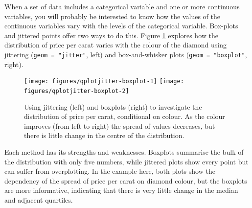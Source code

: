 
When a set of data includes a categorical variable and one or more
continuous variables, you will probably be interested to know how the
values of the continuous variables vary with the levels of the
categorical variable. Box-plots and jittered points offer two ways to do
this. Figure \ref{fig:jitter-boxplot} explores how the distribution of
price per carat varies with the colour of the diamond using jittering
(\texttt{geom = "jitter"}, left) and box-and-whisker plots
(\texttt{geom = "boxplot"}, right).  

\begin{Shaded}
\begin{Highlighting}[]
\StringTok{ }  \NormalTok{)}
\StringTok{ }  \NormalTok{)}
\end{Highlighting}
\end{Shaded}

\begin{figure}

{\centering \texttt{[image: figures/qplotjitter-boxplot-1]} \texttt{[image: figures/qplotjitter-boxplot-2]} 

}

\caption{Using jittering (left) and boxplots (right) to investigate the distribution of price per carat, conditional on colour.  As the colour improves (from left to right) the spread of values decreases, but there is little change in the centre of the distribution.\label{fig:jitter-boxplot}}
\end{figure}

Each method has its strengths and weaknesses. Boxplots summarise the
bulk of the distribution with only five numbers, while jittered plots
show every point but can suffer from overplotting. In the example here,
both plots show the dependency of the spread of price per carat on
diamond colour, but the boxplots are more informative, indicating that
there is very little change in the median and adjacent quartiles.

